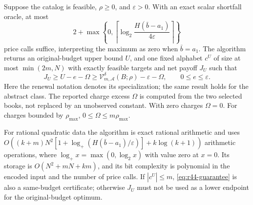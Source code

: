 \begin{theorem}\label{thm:r44-recovery}
Suppose the catalog is feasible, $\rho\geq0$, and $\varepsilon>0$. With an exact scalar shortfall oracle, at most
\begin{equation}\label{eq:r44-calls}
 2+\max\left\{0,\left\lceil\log_2
 \frac{H(\bar b-a_1)}{4\varepsilon}\right\rceil\right\}
\end{equation}
price calls suffice, interpreting the maximum as zero when $\bar b=a_1$. The algorithm returns an original-budget upper bound $U$, and one fixed alphabet $c^U$ of size at most $\min(2m,N)$ with exactly feasible targets and net payoff $J_U$ such that
\begin{equation}\label{eq:r44-guarantee}
 J_U\geq U-e-\Omega\geq
 \mathcal V_{m,\mathcal A}^{\delta}(B;\rho)-\varepsilon-\Omega,
 \qquad 0\leq e\leq\varepsilon.
\end{equation}
Here the renewal notation denotes its specialization; the same result holds for the abstract class. The reported charge excess $\Omega$ is computed from the two selected books, not replaced by an unobserved constant. With zero charges $\Omega=0$. For charges bounded by $\rho_{\max}$, $0\leq\Omega\leq m\rho_{\max}$.

For rational quadratic data the algorithm is exact rational arithmetic and uses
$O((k+m)N^2[1+\log_+(H(\bar b-a_1)/\varepsilon)]+k\log(k+1))$ arithmetic operations, where $\log_+x=\max(0,\log_2x)$ with value zero at $x=0$. Its storage is $O(N^2+mN+km)$, and its bit complexity is polynomial in the encoded input and the number of price calls. If $|c^U|\leq m$, \eqref{eq:r44-guarantee} is also a same-budget certificate; otherwise $J_U$ must not be used as a lower endpoint for the original-budget optimum.
\end{theorem}

